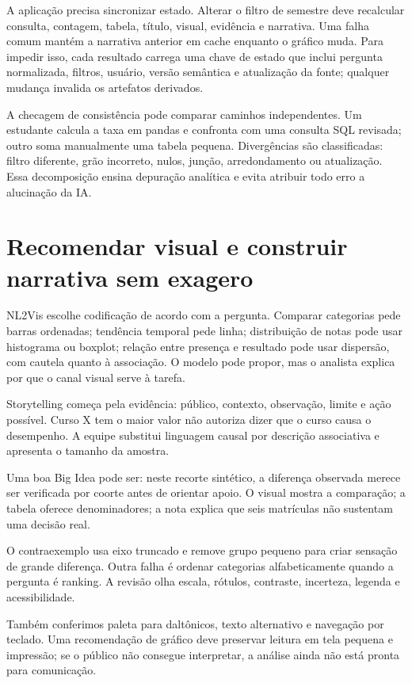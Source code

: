 A aplicação precisa sincronizar estado. Alterar o filtro de semestre deve recalcular consulta, contagem, tabela, título, visual, evidência e narrativa. Uma falha comum mantém a narrativa anterior em cache enquanto o gráfico muda. Para impedir isso, cada resultado carrega uma chave de estado que inclui pergunta normalizada, filtros, usuário, versão semântica e atualização da fonte; qualquer mudança invalida os artefatos derivados.

A checagem de consistência pode comparar caminhos independentes. Um estudante calcula a taxa em pandas e confronta com uma consulta SQL revisada; outro soma manualmente uma tabela pequena. Divergências são classificadas: filtro diferente, grão incorreto, nulos, junção, arredondamento ou atualização. Essa decomposição ensina depuração analítica e evita atribuir todo erro a alucinação da IA.

\section{Recomendar visual e construir narrativa sem exagero}

NL2Vis escolhe codificação de acordo com a pergunta. Comparar categorias pede barras ordenadas; tendência temporal pede linha; distribuição de notas pode usar histograma ou boxplot; relação entre presença e resultado pode usar dispersão, com cautela quanto à associação. O modelo pode propor, mas o analista explica por que o canal visual serve à tarefa.

Storytelling começa pela evidência: público, contexto, observação, limite e ação possível. Curso X tem o maior valor não autoriza dizer que o curso causa o desempenho. A equipe substitui linguagem causal por descrição associativa e apresenta o tamanho da amostra.

Uma boa Big Idea pode ser: neste recorte sintético, a diferença observada merece ser verificada por coorte antes de orientar apoio. O visual mostra a comparação; a tabela oferece denominadores; a nota explica que seis matrículas não sustentam uma decisão real.

O contraexemplo usa eixo truncado e remove grupo pequeno para criar sensação de grande diferença. Outra falha é ordenar categorias alfabeticamente quando a pergunta é ranking. A revisão olha escala, rótulos, contraste, incerteza, legenda e acessibilidade.

Também conferimos paleta para daltônicos, texto alternativo e navegação por teclado. Uma recomendação de gráfico deve preservar leitura em tela pequena e impressão; se o público não consegue interpretar, a análise ainda não está pronta para comunicação.

